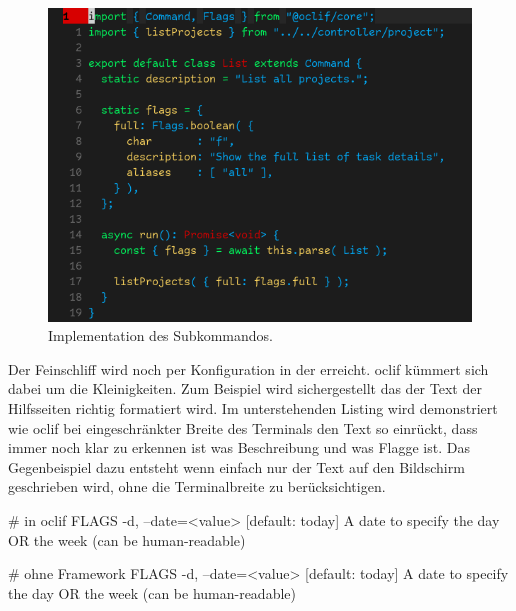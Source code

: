 \documentclass[oneside,bibliography=totocnumbered,BCOR=5mm]{scrbook}
\newenvironment{code}{\captionsetup{type=listing, skip=0pt}}{}
\begin{document}
\begin{figure}[H]
  \centering
  \includegraphics[scale=0.62]{oclif-list.png}
  \caption{Implementation des  Subkommandos.}
  \label{fig:oclif-list}
\end{figure}

Der Feinschliff wird noch per Konfiguration in der 
erreicht. oclif kümmert sich dabei um die Kleinigkeiten. Zum Beispiel wird
sichergestellt das der Text der Hilfsseiten richtig formatiert wird. Im
unterstehenden Listing wird demonstriert wie oclif bei eingeschränkter Breite
des Terminals den Text so einrückt, dass immer noch klar zu erkennen ist was
Beschreibung und was Flagge ist. Das Gegenbeispiel dazu entsteht wenn einfach
nur der Text auf den Bildschirm geschrieben wird, ohne die Terminalbreite zu
berücksichtigen.

\begin{code}
  \begin{shellcode}
# in oclif
FLAGS
  -d, --date=<value>  [default: today] A date to specify the day OR
                      the week (can be human-readable)

# ohne Framework
FLAGS
  -d, --date=<value>  [default: today] A date to specify the day OR
the week (can be human-readable)
  \end{shellcode}
  \label{lst:oclif-umbruch}
  \medskip
\end{code}

\medskip
\end{document}
